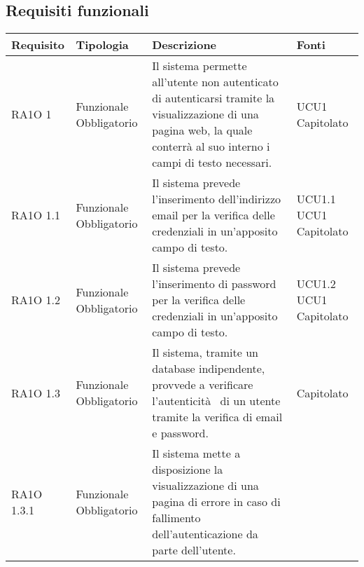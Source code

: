 \subsection{Requisiti funzionali }

      \begin{center}
      \bgroup
      \def\arraystretch{1.8}
      \begin{longtable}{ | l | p{2cm} | p{5cm} | p{1.7cm} |}
    
      \cellcolor[gray]{0.9} \textbf{Requisito} & \cellcolor[gray]{0.9} \textbf{Tipologia} 
      & \cellcolor[gray]{0.9} \textbf{Descrizione} & \cellcolor[gray]{0.9} \textbf{Fonti} \\ \hline
      
        RA1O 1 & Funzionale \newline  Obbligatorio  & Il sistema permette all'utente non autenticato di autenticarsi tramite la visualizzazione di una pagina web, la quale conterrà al suo interno i campi di testo necessari. &  UCU1 \newline  Capitolato \newline  \\ \hline      
        RA1O 1.1 & Funzionale \newline  Obbligatorio  & Il sistema prevede l'inserimento dell'indirizzo email per la verifica delle credenziali in un'apposito campo di testo. &  UCU1.1 \newline  UCU1 \newline  Capitolato \newline  \\ \hline      
        RA1O 1.2 & Funzionale \newline  Obbligatorio  & Il sistema prevede l'inserimento di password per la verifica delle credenziali in un'apposito campo di testo. &  UCU1.2 \newline  UCU1 \newline  Capitolato \newline  \\ \hline      
        RA1O 1.3  & Funzionale \newline  Obbligatorio  & Il sistema, tramite un database indipendente, provvede a verificare l'autenticità  di un utente tramite la verifica di email e password. &  Capitolato \newline  \\ \hline      
        RA1O 1.3.1 & Funzionale \newline  Obbligatorio  & Il sistema mette a disposizione la visualizzazione di una pagina di errore in caso di fallimento dell'autenticazione da parte dell'utente.

\end{longtable}
\end{center}

